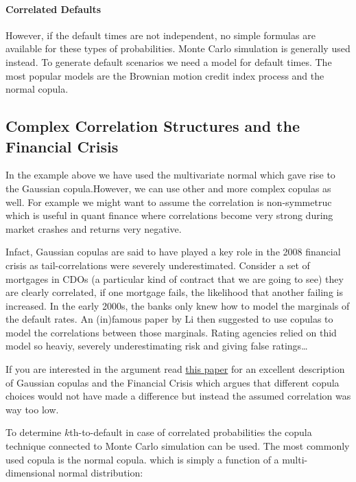\documentclass[11pt]{article}
\begin{document}
    \hypertarget{correlated-defaults}{%
\paragraph{Correlated Defaults}\label{correlated-defaults}}

However, if the default times are not independent, no simple formulas
are available for these types of probabilities. Monte Carlo simulation
is generally used instead. To generate default scenarios we need a model
for default times. The most popular models are the Brownian motion
credit index process and the normal copula.

    \hypertarget{complex-correlation-structures-and-the-financial-crisis}{%
\subsection{Complex Correlation Structures and the Financial
Crisis}\label{complex-correlation-structures-and-the-financial-crisis}}

In the example above we have used the multivariate normal which gave
rise to the Gaussian copula.However, we can use other and more complex
copulas as well. For example we might want to assume the correlation is
non-symmetruc which is useful in quant finance where correlations become
very strong during market crashes and returns very negative.

Infact, Gaussian copulas are said to have played a key role in the 2008
financial crisis as tail-correlations were severely underestimated.
Consider a set of mortgages in CDOs (a particular kind of contract that
we are going to see) they are clearly correlated, if one mortgage fails,
the likelihood that another failing is increased. In the early 2000s,
the banks only knew how to model the marginals of the default rates. An
(in)famous paper by Li then suggested to use copulas to model the
correlations between those marginals. Rating agencies relied on thid
model so heaviy, severely underestimating risk and giving false
ratings\ldots{}

If you are interested in the argument read
\href{http://timmurphy.org/2009/07/22/line-spacing-in-latex-documents/}{this paper}
for an excellent description of Gaussian copulas and the Financial
Crisis which argues that different copula choices would not have made a
difference but instead the assumed correlation was way too low.

    To determine \(k\)th-to-default in case of correlated probabilities the
copula technique connected to Monte Carlo simulation can be used. The
most commonly used copula is the normal copula. which is simply a
function of a multi-dimensional normal distribution:
\end{document}
